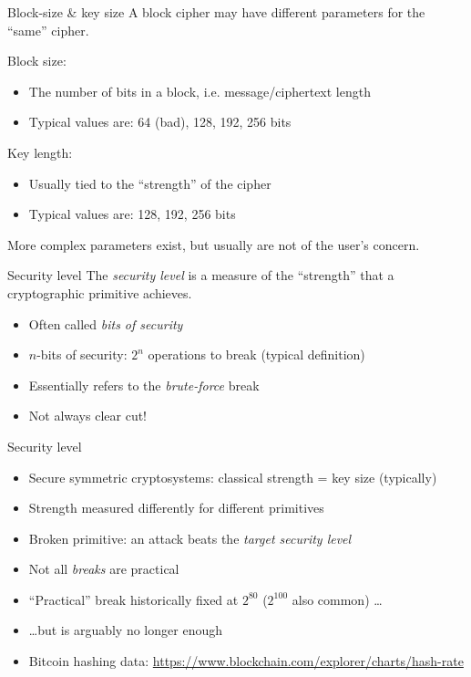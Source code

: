 \begin{frame}{Block-size \& key size}
  A block cipher may have different parameters for the \enquote{same} cipher.

  \pause
  Block size:
  \begin{itemize}
    \item The number of bits in a block, i.e. message/ciphertext length
    \pause
    \item Typical values are: 64 (bad), 128, 192, 256 bits
  \end{itemize}

  \pause
  Key length:
  \begin{itemize}
    \item Usually tied to the \enquote{strength} of the cipher
    \pause
    \item Typical values are: 128, 192, 256 bits
  \end{itemize}

  \pause
  More complex parameters exist, but usually are not of the user's concern.
\end{frame}

\begin{frame}{Security level}
  \pause
  The \emph{security level} is a measure of the \enquote{strength} that a cryptographic primitive achieves.

  \begin{itemize}[<+(1)->]
    \item Often called \emph{bits of security}
    \item $n$-bits of security: $2^n$ operations to break (typical definition)
    \item Essentially refers to the \emph{brute-force} break
    \item Not always clear cut!
  \end{itemize}
\end{frame}

\begin{frame}{Security level}
  \begin{itemize}[<+->]
    \item Secure symmetric cryptosystems: classical strength = key size (typically)
    \item Strength measured differently for different primitives
    \item Broken primitive: an attack beats the \emph{target security level}
    \item Not all \emph{breaks} are practical
    \item \enquote{Practical} break historically fixed at $2^{80}$ ($2^{100}$ also common) \dots
    \item \dots{}but is arguably no longer enough
    \item Bitcoin hashing data: \url{https://www.blockchain.com/explorer/charts/hash-rate}
  \end{itemize}
\end{frame}

